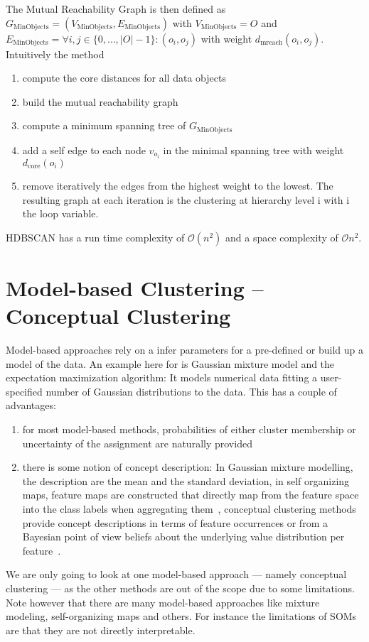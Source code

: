 \noindent The Mutual Reachability Graph is then defined as $G_{\text{MinObjects}} = (V_{\text{MinObjects}}, E_{\text{MinObjects}})$ with $V_{\text{MinObjects}} = O$ and $E_{\text{MinObjects}} = \forall i, j \in \{0, \dots, |O| - 1\}: (o_i, o_j) $ with weight $d_{\text{mreach}}(o_i, o_j)$.\\

\noindent Intuitively the method
\begin{enumerate}
\item compute the core distances for all data objects
    \item build the mutual reachability graph
    \item compute a minimum spanning tree of $G_{\text{MinObjects}}$
    \item add a self edge to each node $v_{o_i}$ in the minimal spanning tree with weight $d_{\text{core}}(o_i)$
    \item remove iteratively the edges from the highest weight to the lowest. The resulting graph at each iteration is the clustering at hierarchy level i with i the loop variable.
\end{enumerate}
HDBSCAN has a run time complexity of $\mathcal{O}(n^2)$ and a space complexity of $\mathcal{O}n^2$.

\section{Model-based Clustering -- Conceptual Clustering}\label{\positionnumber}
Model-based approaches rely on a infer parameters for a pre-defined or build up a model of the data. An example here for is Gaussian mixture model and the expectation maximization algorithm: It models numerical data fitting a user-specified number of Gaussian distributions to the data. This has a couple of advantages:
\begin{enumerate}
    \item for most model-based methods, probabilities of either cluster membership or uncertainty of the assignment are naturally provided 
    \item there is some notion of concept description: In Gaussian mixture modelling, the description are the mean and the standard deviation, in self organizing maps, feature maps are constructed that directly map from the feature space into the class labels when aggregating them~\cite{yosinski-2015-ICML-DL-understanding-neural-networks}, conceptual clustering methods provide concept descriptions in terms of feature occurrences or from a Bayesian point of view beliefs about the underlying value distribution per feature~\cite{Fisher1987}.
\end{enumerate}
We are only going to look at one model-based approach --- namely conceptual clustering --- as the other methods are out of the scope due to some limitations. Note however that there are many model-based approaches like mixture modeling, self-organizing maps and others. For instance the limitations of SOMs are that they are not directly interpretable. \\

